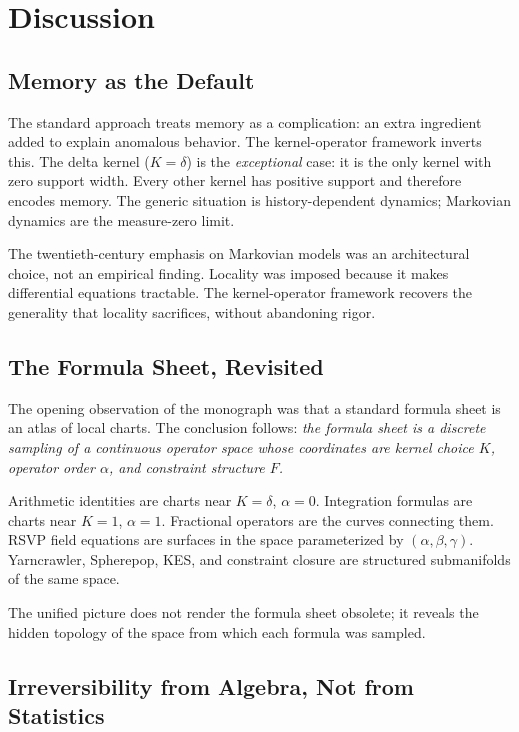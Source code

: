 \documentclass[12pt]{article}
\begin{document}
\section{Discussion}
\label{sec:discussion}

\subsection{Memory as the Default}

The standard approach treats memory as a complication: an extra ingredient
added to explain anomalous behavior. The kernel-operator framework inverts
this. The delta kernel ($K = \delta$) is the \emph{exceptional} case:
it is the only kernel with zero support width. Every other kernel has
positive support and therefore encodes memory. The generic situation is
history-dependent dynamics; Markovian dynamics are the measure-zero limit.

The twentieth-century emphasis on Markovian models was an architectural
choice, not an empirical finding. Locality was imposed because it makes
differential equations tractable. The kernel-operator framework recovers
the generality that locality sacrifices, without abandoning rigor.

\subsection{The Formula Sheet, Revisited}

The opening observation of the monograph was that a standard formula sheet
is an atlas of local charts. The conclusion follows: \textit{the formula
sheet is a discrete sampling of a continuous operator space whose coordinates
are kernel choice $K$, operator order $\alpha$, and constraint structure $F$.}

Arithmetic identities are charts near $K = \delta$, $\alpha = 0$.
Integration formulas are charts near $K = 1$, $\alpha = 1$.
Fractional operators are the curves connecting them.
RSVP field equations are surfaces in the space parameterized by
$(\alpha, \beta, \gamma)$.
Yarncrawler, Spherepop, KES, and constraint closure are structured
submanifolds of the same space.

The unified picture does not render the formula sheet obsolete; it
reveals the hidden topology of the space from which each formula was
sampled.

\subsection{Irreversibility from Algebra, Not from Statistics}
\end{document}
